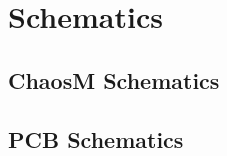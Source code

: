 
\chapter{Schematics}\label{apx:schematics}

\section{ChaosM Schematics}
\clearpage


\section{PCB Schematics}
